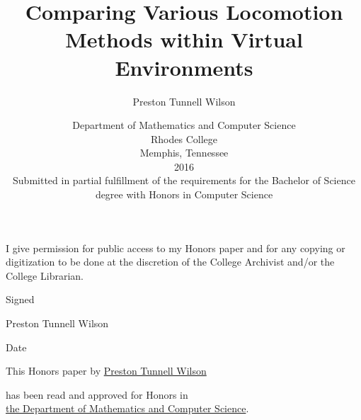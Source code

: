 \documentclass[titlepage]{article}
\theoremstyle{definition}
\theoremstyle{proof}
\begin{document}



\begin{minipage}[h]{5in}
  I give permission for public access to my Honors paper
  and for any copying or digitization to be done
  at the discretion of the College Archivist and/or the College Librarian.

  \vspace{1in}
  Signed \hrulefill

  \vspace{.5in}
  Preston Tunnell Wilson \hdashrule{3.58in}{1pt}{1pt}

  \vspace{.5in}
  Date \hrulefill
\end{minipage}

\newpage

\rhead{\thepage}
\title{
  Comparing Various Locomotion Methods within Virtual Environments
}

\author{
  Preston Tunnell Wilson }

\date{
  Department of Mathematics and Computer Science\\
  Rhodes College\\
  Memphis, Tennessee\\
  \vspace{2in}
  2016\\
  \vspace{2in}
  Submitted in partial fulfillment of the requirements
  for the Bachelor of Science degree with Honors in Computer Science
}

\maketitle

\setcounter{page}{2}
\noindent This Honors paper by
\underline{Preston Tunnell Wilson \hfill}

\noindent has been read and approved for Honors in\\
\underline{the Department of Mathematics and Computer Science}.
\end{document}
